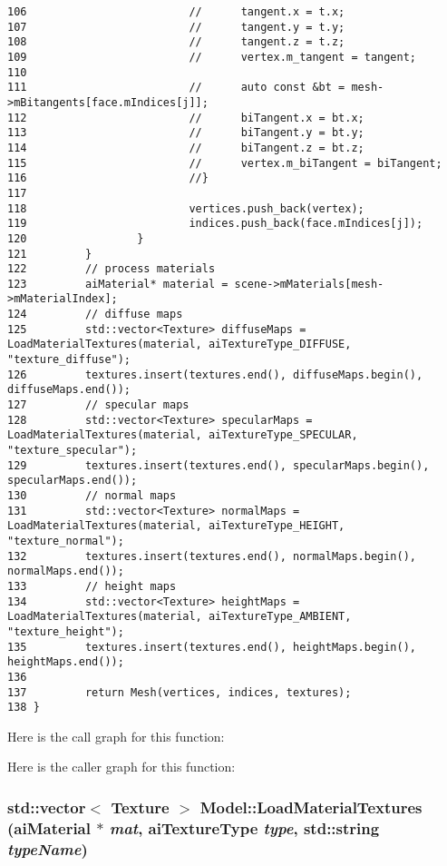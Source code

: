\begin{Code}
\begin{verbatim}
106                         //      tangent.x = t.x;
107                         //      tangent.y = t.y;
108                         //      tangent.z = t.z;
109                         //      vertex.m_tangent = tangent;
110 
111                         //      auto const &bt = mesh->mBitangents[face.mIndices[j]];
112                         //      biTangent.x = bt.x;
113                         //      biTangent.y = bt.y;
114                         //      biTangent.z = bt.z;
115                         //      vertex.m_biTangent = biTangent;
116                         //}
117 
118                         vertices.push_back(vertex);
119                         indices.push_back(face.mIndices[j]);
120                 }
121         }
122         // process materials
123         aiMaterial* material = scene->mMaterials[mesh->mMaterialIndex];
124         // diffuse maps
125         std::vector<Texture> diffuseMaps = LoadMaterialTextures(material, aiTextureType_DIFFUSE, "texture_diffuse");
126         textures.insert(textures.end(), diffuseMaps.begin(), diffuseMaps.end());
127         // specular maps
128         std::vector<Texture> specularMaps = LoadMaterialTextures(material, aiTextureType_SPECULAR, "texture_specular");
129         textures.insert(textures.end(), specularMaps.begin(), specularMaps.end());
130         // normal maps
131         std::vector<Texture> normalMaps = LoadMaterialTextures(material, aiTextureType_HEIGHT, "texture_normal");
132         textures.insert(textures.end(), normalMaps.begin(), normalMaps.end());
133         // height maps
134         std::vector<Texture> heightMaps = LoadMaterialTextures(material, aiTextureType_AMBIENT, "texture_height");
135         textures.insert(textures.end(), heightMaps.begin(), heightMaps.end());
136 
137         return Mesh(vertices, indices, textures);
138 }
\end{verbatim}
\end{Code}




Here is the call graph for this function:

Here is the caller graph for this function:\hypertarget{class_model_43da250403b6d11aa1a0f54c9021ac45}{
\subsubsection[LoadMaterialTextures]{\setlength{\rightskip}{0pt plus 5cm}std::vector$<$ Texture $>$ Model::LoadMaterialTextures ({\bf aiMaterial} $\ast$ {\em mat}, \/  {\bf aiTextureType} {\em type}, \/  std::string {\em typeName})}}
\label{class_model_43da250403b6d11aa1a0f54c9021ac45}


